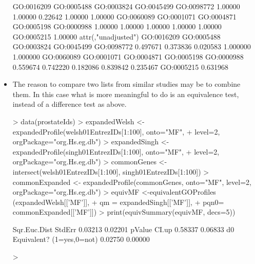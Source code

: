 \documentclass[a4paper]{article}
\begin{document}
\begin{itemize}
\begin{Schunk}
\begin{Soutput}
GO:0016209 GO:0005488 GO:0003824 GO:0045499 GO:0098772 
   1.00000    1.00000    0.22642    1.00000    1.00000 
GO:0060089 GO:0001071 GO:0004871 GO:0005198 GO:0000988 
   1.00000    1.00000    1.00000    1.00000    1.00000 
GO:0005215 
   1.00000 
attr(,"unadjusted")
GO:0016209 GO:0005488 GO:0003824 GO:0045499 GO:0098772 
  0.497671   0.373836   0.020583   1.000000   1.000000 
GO:0060089 GO:0001071 GO:0004871 GO:0005198 GO:0000988 
  0.559674   0.742220   0.182086   0.839842   0.235467 
GO:0005215 
  0.631968 
\end{Soutput}
\end{Schunk}
\item The reason to compare two lists from similar studies may be to combine them. 
In this case what is more meaningful to do is an equivalence test, instead of a difference test as above.
\begin{Schunk}
\begin{Sinput}
> data(prostateIds)
> expandedWelsh <- expandedProfile(welsh01EntrezIDs[1:100], onto="MF",
+                         level=2, orgPackage="org.Hs.eg.db")
> expandedSingh <- expandedProfile(singh01EntrezIDs[1:100], onto="MF",
+                         level=2, orgPackage="org.Hs.eg.db")
> commonGenes <- intersect(welsh01EntrezIDs[1:100], singh01EntrezIDs[1:100])
> commonExpanded <- expandedProfile(commonGenes, onto="MF", level=2, orgPackage="org.Hs.eg.db")
> equivMF <-equivalentGOProfiles (expandedWelsh[['MF']], 
+                           qm  = expandedSingh[['MF']], 
+                           pqn0= commonExpanded[['MF']])
> print(equivSummary(equivMF, decs=5))
\end{Sinput}
\begin{Soutput}
             Sqr.Euc.Dist                    StdErr 
                  0.03213                   0.02201 
                   pValue                     CI.up 
                  0.58337                   0.06833 
                       d0 Equivalent? (1=yes,0=not) 
                  0.02750                   0.00000 
\end{Soutput}
\begin{Sinput}
> 
\end{Sinput}
\end{Schunk}
\end{itemize}
\end{document}
